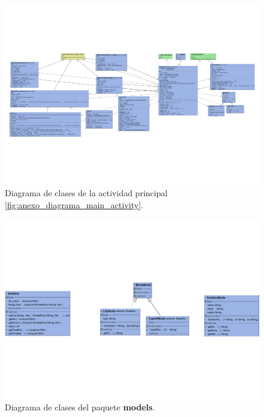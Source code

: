 \begin{figure}[H]
	\centering
	\includegraphics[scale=.8,angle=90]{imagenes/main_activity_class_diagram.pdf}
	\caption{Diagrama de clases de la actividad principal \ref{fig:anexo_diagrama_main_activity}. }
	\label{fig:main_activity_diagram}
\end{figure}
\begin{figure}[H]
	\centering
	\includegraphics[scale=0.8,angle=90]{imagenes/models_package.pdf}
	\caption{Diagrama de clases del paquete \textbf{models}.}
	\label{fig:models_diagram}
\end{figure}

